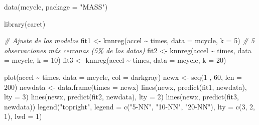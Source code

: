 \documentclass[
  spanish,
]{book}
\newenvironment{Shaded}{\begin{snugshade}}{\end{snugshade}}
\newcommand{\AttributeTok}[1]{\textcolor[rgb]{0.77,0.63,0.00}{#1}}
\newcommand{\CommentTok}[1]{\textcolor[rgb]{0.56,0.35,0.01}{\textit{#1}}}
\newcommand{\DecValTok}[1]{\textcolor[rgb]{0.00,0.00,0.81}{#1}}
\newcommand{\FunctionTok}[1]{\textcolor[rgb]{0.00,0.00,0.00}{#1}}
\newcommand{\NormalTok}[1]{#1}
\newcommand{\OtherTok}[1]{\textcolor[rgb]{0.56,0.35,0.01}{#1}}
\newcommand{\SpecialCharTok}[1]{\textcolor[rgb]{0.00,0.00,0.00}{#1}}
\newcommand{\StringTok}[1]{\textcolor[rgb]{0.31,0.60,0.02}{#1}}
\theoremstyle{break}
\theoremstyle{definition}
\theoremstyle{definition}
\theoremstyle{definition}
\theoremstyle{definition}
\theoremstyle{remark}
\begin{document}
\begin{Shaded}
\begin{Highlighting}[]
\FunctionTok{data}\NormalTok{(mcycle, }\AttributeTok{package =} \StringTok{"MASS"}\NormalTok{)}

\FunctionTok{library}\NormalTok{(caret)}

\CommentTok{\# Ajuste de los modelos}
\NormalTok{fit1 }\OtherTok{\textless{}{-}} \FunctionTok{knnreg}\NormalTok{(accel }\SpecialCharTok{\textasciitilde{}}\NormalTok{ times, }\AttributeTok{data =}\NormalTok{ mcycle, }\AttributeTok{k =} \DecValTok{5}\NormalTok{) }\CommentTok{\# 5 observaciones más cercanas (5\% de los datos)}
\NormalTok{fit2 }\OtherTok{\textless{}{-}} \FunctionTok{knnreg}\NormalTok{(accel }\SpecialCharTok{\textasciitilde{}}\NormalTok{ times, }\AttributeTok{data =}\NormalTok{ mcycle, }\AttributeTok{k =} \DecValTok{10}\NormalTok{)}
\NormalTok{fit3 }\OtherTok{\textless{}{-}} \FunctionTok{knnreg}\NormalTok{(accel }\SpecialCharTok{\textasciitilde{}}\NormalTok{ times, }\AttributeTok{data =}\NormalTok{ mcycle, }\AttributeTok{k =} \DecValTok{20}\NormalTok{)}

\FunctionTok{plot}\NormalTok{(accel }\SpecialCharTok{\textasciitilde{}}\NormalTok{ times, }\AttributeTok{data =}\NormalTok{ mcycle, }\AttributeTok{col =} \StringTok{\textquotesingle{}darkgray\textquotesingle{}}\NormalTok{) }
\NormalTok{newx }\OtherTok{\textless{}{-}} \FunctionTok{seq}\NormalTok{(}\DecValTok{1}\NormalTok{ , }\DecValTok{60}\NormalTok{, }\AttributeTok{len =} \DecValTok{200}\NormalTok{)}
\NormalTok{newdata }\OtherTok{\textless{}{-}} \FunctionTok{data.frame}\NormalTok{(}\AttributeTok{times =}\NormalTok{ newx)}
\FunctionTok{lines}\NormalTok{(newx, }\FunctionTok{predict}\NormalTok{(fit1, newdata), }\AttributeTok{lty =} \DecValTok{3}\NormalTok{)}
\FunctionTok{lines}\NormalTok{(newx, }\FunctionTok{predict}\NormalTok{(fit2, newdata), }\AttributeTok{lty =} \DecValTok{2}\NormalTok{)}
\FunctionTok{lines}\NormalTok{(newx, }\FunctionTok{predict}\NormalTok{(fit3, newdata))}
\FunctionTok{legend}\NormalTok{(}\StringTok{"topright"}\NormalTok{, }\AttributeTok{legend =} \FunctionTok{c}\NormalTok{(}\StringTok{"5{-}NN"}\NormalTok{, }\StringTok{"10{-}NN"}\NormalTok{, }\StringTok{"20{-}NN"}\NormalTok{), }
       \AttributeTok{lty =} \FunctionTok{c}\NormalTok{(}\DecValTok{3}\NormalTok{, }\DecValTok{2}\NormalTok{, }\DecValTok{1}\NormalTok{), }\AttributeTok{lwd =} \DecValTok{1}\NormalTok{)}
\end{Highlighting}
\end{Shaded}
\end{document}
